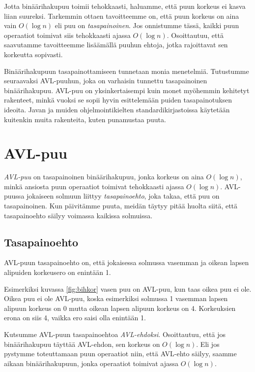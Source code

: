 Jotta binäärihakupuu toimii tehokkaasti, haluamme,
että puun korkeus ei kasva liian suureksi.
Tarkemmin ottaen tavoitteemme on, että puun korkeus on
aina vain $O(\log n)$ eli puu on \emph{tasapainoinen}.
Jos onnistumme tässä, kaikki puun operaatiot toimivat
siis tehokkaasti ajassa $O(\log n)$.
Osoittautuu, että saavutamme tavoitteemme
lisäämällä puuhun ehtoja, jotka rajoittavat
sen korkeutta sopivasti.

Binäärihakupuun tasapainottamiseen tunnetaan monia menetelmiä.
Tutustumme seuraavaksi AVL-puuhun, joka on 
varhaisin tunnettu tasapainoinen binäärihakupuu.
AVL-puu on yksinkertaisempi kuin monet myöhemmin
kehitetyt rakenteet, minkä vuoksi se sopii hyvin esittelemään
puiden tasapainotuksen ideoita.
Javan ja muiden ohjelmointikielten standardikirjastoissa
käyte\-tään kuitenkin muita rakenteita, kuten punamustaa puuta.

\section{AVL-puu}

\emph{AVL-puu} on tasapainoinen binäärihakupuu, jonka
korkeus on aina $O(\log n)$, minkä ansiosta puun operaatiot
toimivat tehokkaasti ajassa $O(\log n)$.
AVL-puussa jokaiseen solmuun liittyy \emph{tasapainoehto},
joka takaa, että puu on tasapainoinen.
Kun päivitämme puuta, meidän täytyy pitää huolta siitä,
että tasapainoehto säilyy voimassa kaikissa solmuissa.

\subsection{Tasapainoehto}

AVL-puun tasapainoehto on, että
jokaisessa solmussa vasemman ja oikean lapsen alipuiden korkeusero 
on enintään 1.

Esimerkiksi kuvassa \ref{fig:bihkor} vasen puu on
AVL-puu, kun taas oikea puu ei ole.
Oikea puu ei ole AVL-puu, koska esimerkiksi solmussa 1
vasemman lapsen alipuun korkeus on 0 mutta oikean lapsen
alipuun korkeus on 4.
Korkeuksien erona on siis 4, vaikka ero saisi olla enintään 1.

Kutsumme AVL-puun tasapainoehtoa \emph{AVL-ehdoksi}.
Osoittautuu, että jos binäärihakupuu täyttää AVL-ehdon,
sen korkeus on $O(\log n)$.
Eli jos pystymme toteuttamaan puun operaatiot niin,
että AVL-ehto säilyy, saamme aikaan binäärihakupuun,
jonka operaatiot toimivat ajassa $O(\log n)$.


